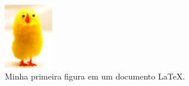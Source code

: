 \documentclass{article}
\begin{document}
\begin{figure}
  \centering
  \includegraphics{chick.png}
  \caption{Minha primeira figura em um documento LaTeX.}
\end{figure}
\end{document}
